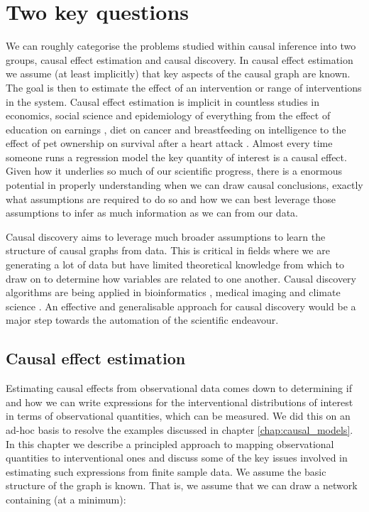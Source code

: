 \documentclass[11pt,a4paper,oneside]{book}
\theoremstyle{plain}
\theoremstyle{definition}
\begin{document}
\chapter{Two key questions}
\label{chap:two_key_questions}

We can roughly categorise the problems studied within causal inference into two groups, causal effect estimation and causal discovery. In causal effect estimation we assume (at least implicitly) that key aspects of the causal graph are known. The goal is then to estimate the effect of an intervention or range of interventions in the system. Causal effect estimation is implicit in countless studies in economics, social science and epidemiology of everything from the effect of education on earnings \citep{card1999causal}, diet on cancer \citep{bingham2004diet} and breastfeeding on intelligence \citep{jain2002good} to the effect of pet ownership on survival after a heart attack \citep{friedmann1995pet}. Almost every time someone runs a regression model the key quantity of interest is a causal effect. Given how it underlies so much of our scientific progress, there is a enormous potential in properly understanding when we can draw causal conclusions, exactly what assumptions are required to do so and how we can best leverage those assumptions to infer as much information as we can from our data. 

Causal discovery aims to leverage much broader assumptions to learn the structure of causal graphs from data. This is critical in fields where we are generating a lot of data but have limited theoretical knowledge from which to draw on to determine how variables are related to one another. Causal discovery algorithms are being applied in bioinformatics \citep{Bay2002,Sachs2005,Ram2006,Alekseyenko2011,Statnikov2012,Gao2015,Sokolova2015,Taruttis2015}, medical imaging \citep{Ramsey2010} and climate science \citep{Uphoff2013}. An effective and generalisable approach for causal discovery would be a major step towards the automation of the scientific endeavour.

\section{Causal effect estimation} 
\label{sec:causal effect estimation}

Estimating causal effects from observational data comes down to determining if and how we can write expressions for the interventional distributions of interest in terms of observational quantities, which can be measured. We did this on an ad-hoc basis to resolve the examples discussed in chapter \ref{chap:causal_models}. In this chapter we describe a principled approach to mapping observational quantities to interventional ones and discuss some of the key issues involved in estimating such expressions from finite sample data. We assume the basic structure of the graph is known. That is, we assume that we can draw a network containing (at a minimum):
\end{document}
